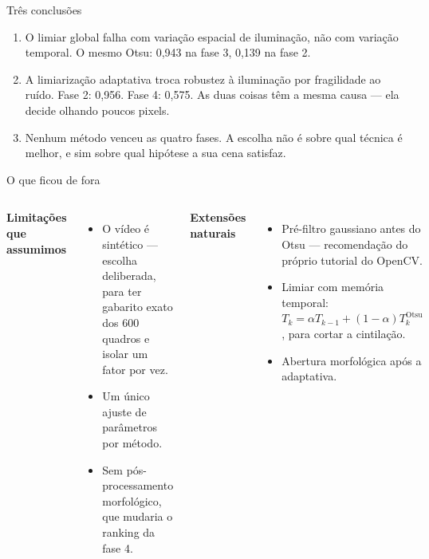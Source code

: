 \documentclass[aspectratio=169,12pt]{beamer}
\newcommand{\sub}[1]{{\small\textcolor{cinza}{#1}}}
\begin{document}
\begin{frame}{Três conclusões}

  \begin{enumerate}
    \setlength{\itemsep}{1.1em}
    \item O limiar global falha com variação \alert{espacial} de iluminação, não
      com variação temporal.
      \sub{O mesmo Otsu: 0,943 na fase 3, 0,139 na fase 2.}

    \item A limiarização adaptativa troca robustez à iluminação por fragilidade
      ao \alert{ruído}.
      \sub{Fase 2: 0,956. Fase 4: 0,575. As duas coisas têm a mesma causa —
      ela decide olhando poucos pixels.}

    \item \alert{Nenhum método venceu as quatro fases.}
      \sub{A escolha não é sobre qual técnica é melhor, e sim sobre qual
      hipótese a sua cena satisfaz.}
  \end{enumerate}

\end{frame}

\begin{frame}{O que ficou de fora}

  \begin{columns}[T,onlytextwidth]
      \textbf{Limitações que assumimos}

      \vspace{.5em}
      \begin{itemize}
        \item O vídeo é sintético — escolha deliberada, para ter gabarito exato
          dos 600 quadros e isolar um fator por vez.
        \item Um único ajuste de parâmetros por método.
        \item Sem pós-processamento morfológico, que mudaria o ranking da
          fase 4.
      \end{itemize}

      \textbf{Extensões naturais}

      \vspace{.5em}
      \begin{itemize}
        \item Pré-filtro gaussiano antes do Otsu — recomendação do próprio
          tutorial do OpenCV.
        \item Limiar com memória temporal:
          $T_k=\alpha T_{k-1}+(1-\alpha)T_k^{\text{Otsu}}$, para cortar a
          cintilação.
        \item Abertura morfológica após a adaptativa.
      \end{itemize}
  \end{columns}

\end{frame}
\end{document}
